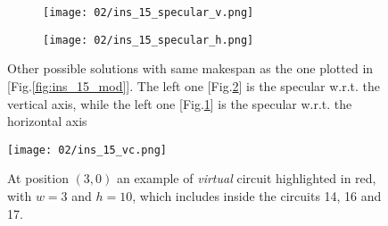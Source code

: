         \begin{figure}[H]
            \centering
            \begin{subfigure}[b]{0.45\textwidth}
                \centering
                \texttt{[image: 02/ins\_15\_specular\_v.png]}
                \caption{}
                \label{fig:ins_15_specular_v}
            \end{subfigure}
            \hfill
            \begin{subfigure}[b]{0.45\textwidth}
                \centering 
                \texttt{[image: 02/ins\_15\_specular\_h.png]}
                \caption{}
                \label{fig:ins_15_specular_h}
            \end{subfigure}
            \hfill
            \caption{
                Other possible solutions with same makespan as the one plotted in [Fig.\ref{fig:ins_15_mod}].
                The left one [Fig.\ref{fig:ins_15_specular_h}] is the specular w.r.t. the vertical axis,
                while the left one [Fig.\ref{fig:ins_15_specular_v}] is the specular w.r.t. the horizontal axis
            }
            \label{fig:symmetry_specular}
        \end{figure}

        \begin{figure}[H]
            \centering
            \texttt{[image: 02/ins\_15\_vc.png]}
            \caption{
                At position $(3,0)$ an example of \textit{virtual} circuit highlighted in red,
                with $w = 3$ and $h = 10$, which includes inside the circuits 14, 16 and 17.
            }
            \label{fig:virtual circuit}
        \end{figure}

